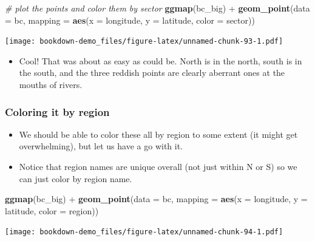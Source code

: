 \documentclass[]{book}
\newenvironment{Shaded}{\begin{snugshade}}{\end{snugshade}}
\newcommand{\KeywordTok}[1]{\textcolor[rgb]{0.13,0.29,0.53}{\textbf{{#1}}}}
\newcommand{\DataTypeTok}[1]{\textcolor[rgb]{0.13,0.29,0.53}{{#1}}}
\newcommand{\StringTok}[1]{\textcolor[rgb]{0.31,0.60,0.02}{{#1}}}
\newcommand{\CommentTok}[1]{\textcolor[rgb]{0.56,0.35,0.01}{\textit{{#1}}}}
\newcommand{\NormalTok}[1]{{#1}}
\providecommand{\tightlist}{%
  \setlength{\itemsep}{0pt}\setlength{\parskip}{0pt}}
\theoremstyle{definition}
\theoremstyle{definition}
\theoremstyle{remark}
\begin{document}
\begin{Shaded}
\begin{Highlighting}[]
\CommentTok{# plot the points and color them by sector}
\KeywordTok{ggmap}\NormalTok{(bc_big) +}\StringTok{ }
\StringTok{  }\KeywordTok{geom_point}\NormalTok{(}\DataTypeTok{data =} \NormalTok{bc, }\DataTypeTok{mapping =} \KeywordTok{aes}\NormalTok{(}\DataTypeTok{x =} \NormalTok{longitude, }\DataTypeTok{y =} \NormalTok{latitude, }\DataTypeTok{color =} \NormalTok{sector))}
\end{Highlighting}
\end{Shaded}

\texttt{[image: bookdown-demo\_files/figure-latex/unnamed-chunk-93-1.pdf]}

\begin{itemize}
\tightlist
\item
  Cool! That was about as easy as could be. North is in the north, south
  is in the south, and the three reddish points are clearly aberrant
  ones at the mouths of rivers.
\end{itemize}

\subsubsection{Coloring it by region}\label{coloring-it-by-region}

\begin{itemize}
\tightlist
\item
  We should be able to color these all by region to some extent (it
  might get overwhelming), but let us have a go with it.
\item
  Notice that region names are unique overall (not just within N or S)
  so we can just color by region name.
\end{itemize}

\begin{Shaded}
\begin{Highlighting}[]
\KeywordTok{ggmap}\NormalTok{(bc_big) +}\StringTok{ }
\StringTok{  }\KeywordTok{geom_point}\NormalTok{(}\DataTypeTok{data =} \NormalTok{bc, }\DataTypeTok{mapping =} \KeywordTok{aes}\NormalTok{(}\DataTypeTok{x =} \NormalTok{longitude, }\DataTypeTok{y =} \NormalTok{latitude, }\DataTypeTok{color =} \NormalTok{region))}
\end{Highlighting}
\end{Shaded}

\texttt{[image: bookdown-demo\_files/figure-latex/unnamed-chunk-94-1.pdf]}
\end{document}
